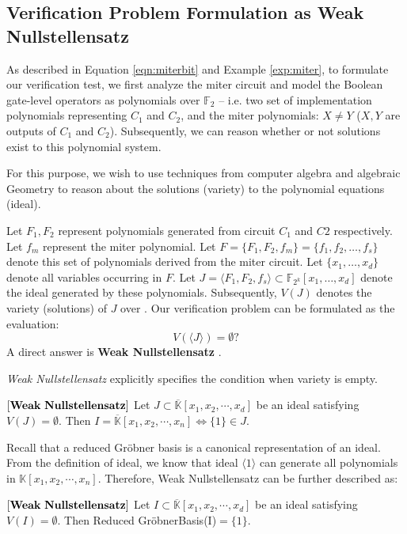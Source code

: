 \subsection{Verification Problem Formulation as Weak Nullstellensatz}

As described in Equation \ref{eqn:miterbit} and Example \ref{exp:miter},
to formulate our verification test, we first analyze the miter circuit and 
model the Boolean gate-level operators as polynomials over $\mathbb{F}_2$
-- i.e. two set of implementation polynomials representing $C_{1}$ and $C_{2}$, 
and the miter polynomials: $X \neq Y$ ($X,Y$ are outputs of $C_{1}$ and $C_{2}$). 
Subsequently, we can reason whether or not solutions exist
to this polynomial system. 

For this purpose, we wish to use techniques from computer algebra and algebraic Geometry to reason about the
solutions (variety) to the polynomial equations (ideal). 

Let $F_1, F_2$ represent polynomials generated from circuit $C_1$ and $C2$ respectively.
Let $f_m$ represent the miter polynomial.
Let $F=\{F_1,F_2,f_m\}=\{f_1,f_2,\ldots,f_s\}$ denote this set of polynomials derived from the miter circuit. 
Let $\{x_1,\dots,x_d\}$ denote all variables occurring in $F$.
Let $J = \langle F_1,F_2,f_s\rangle \subset \mathbb{F}_{2^k}[x_{1},\dots,x_{d}]$ denote the ideal generated by these polynomials.
Subsequently, $V(J)$ denotes the variety (solutions) of $J$ over .
Our verification problem can be formulated as the evaluation:
\begin{equation}
V(\langle J\rangle)=\emptyset?
\end{equation}
A direct answer is {\bf Weak Nullstellensatz} \cite{null:1890}.


{\it Weak  Nullstellensatz} explicitly specifies the condition when variety is empty.

\begin{Theorem}
$\left[\bf{Weak\  Nullstellensatz}\right]$ Let $J \subset \overline {\mathbb{K}}[x_1, x_2, \cdots, x_d]$ be an ideal satisfying $V(J)=\emptyset$. 
Then $I=\overline {\mathbb{K}}[x_1, x_2, \cdots, x_n] \iff \{1\} \in J$.
\end{Theorem}

Recall that a reduced Gr\"obner basis is a canonical representation of an ideal. 
From the definition of ideal, we know that ideal $\langle 1 \rangle$ can 
generate all polynomials in $\mathbb{K}[x_1, x_2, \cdots, x_n]$. 
Therefore, Weak Nullstellensatz can be further described as:
\begin{Corollary}\label{cor:wnf2}
$\left[\bf{Weak\  Nullstellensatz}\right]$ Let $I \subset \overline {\mathbb{K}}[x_1, x_2, \cdots, x_d]$ be an ideal satisfying $V(I)=\emptyset$. 
Then Reduced Gr\"obnerBasis(I)$=\{1\}$.
\end{Corollary}


